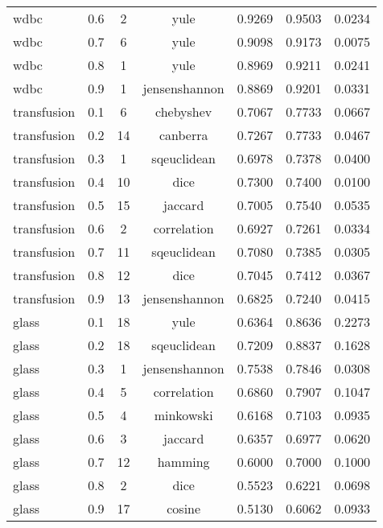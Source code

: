 \begin{table}[ht]
\begin{tabular}{lcccccc}
wdbc & 0.6 & 2 & yule & 0.9269 & 0.9503 & 0.0234 \\
wdbc & 0.7 & 6 & yule & 0.9098 & 0.9173 & 0.0075 \\
wdbc & 0.8 & 1 & yule & 0.8969 & 0.9211 & 0.0241 \\
wdbc & 0.9 & 1 & jensenshannon & 0.8869 & 0.9201 & 0.0331 \\
transfusion & 0.1 & 6 & chebyshev & 0.7067 & 0.7733 & 0.0667 \\
transfusion & 0.2 & 14 & canberra & 0.7267 & 0.7733 & 0.0467 \\
transfusion & 0.3 & 1 & sqeuclidean & 0.6978 & 0.7378 & 0.0400 \\
transfusion & 0.4 & 10 & dice & 0.7300 & 0.7400 & 0.0100 \\
transfusion & 0.5 & 15 & jaccard & 0.7005 & 0.7540 & 0.0535 \\
transfusion & 0.6 & 2 & correlation & 0.6927 & 0.7261 & 0.0334 \\
transfusion & 0.7 & 11 & sqeuclidean & 0.7080 & 0.7385 & 0.0305 \\
transfusion & 0.8 & 12 & dice & 0.7045 & 0.7412 & 0.0367 \\
transfusion & 0.9 & 13 & jensenshannon & 0.6825 & 0.7240 & 0.0415 \\
glass & 0.1 & 18 & yule & 0.6364 & 0.8636 & 0.2273 \\
glass & 0.2 & 18 & sqeuclidean & 0.7209 & 0.8837 & 0.1628 \\
glass & 0.3 & 1 & jensenshannon & 0.7538 & 0.7846 & 0.0308 \\
glass & 0.4 & 5 & correlation & 0.6860 & 0.7907 & 0.1047 \\
glass & 0.5 & 4 & minkowski & 0.6168 & 0.7103 & 0.0935 \\
glass & 0.6 & 3 & jaccard & 0.6357 & 0.6977 & 0.0620 \\
glass & 0.7 & 12 & hamming & 0.6000 & 0.7000 & 0.1000 \\
glass & 0.8 & 2 & dice & 0.5523 & 0.6221 & 0.0698 \\
glass & 0.9 & 17 & cosine & 0.5130 & 0.6062 & 0.0933 \\
\hline
\end{tabular}
\end{table}